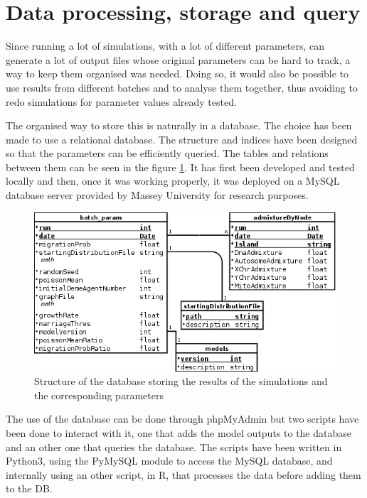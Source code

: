 \documentclass[a4paper,12pt]{report}
\begin{document}
\section{Data processing, storage and query}
Since running a lot of simulations, with a lot of different parameters, can generate a lot of output files whose original parameters can be hard to track, a way to keep them organised was needed. Doing so, it would also be possible to use results from different batches and to analyse them together, thus avoiding to redo simulations for parameter values already tested.

The organised way to store this is naturally in a database. The choice has been made to use a relational database. The structure and indices have been designed so that the parameters can be efficiently queried. The tables and relations between them can be seen in the figure \ref{db}. It has first been developed and tested locally and then, once it was working properly, it was deployed on a MySQL database server provided by Massey University for research purposes.

\begin{figure}[!ht]
	\includegraphics[width=1\textwidth]{../data/DB.png}
	\caption{Structure of the database storing the results of the simulations and the corresponding parameters}
	\label{db}
\end{figure}

The use of the database can be done through phpMyAdmin but two scripts have been done to interact with it, one that adds the model outputs to the database and an other one that queries the database. The scripts have been written in Python3, using the PyMySQL module to access the MySQL database, and internally using an other script, in R, that processes the data before adding them to the DB.
\end{document}
